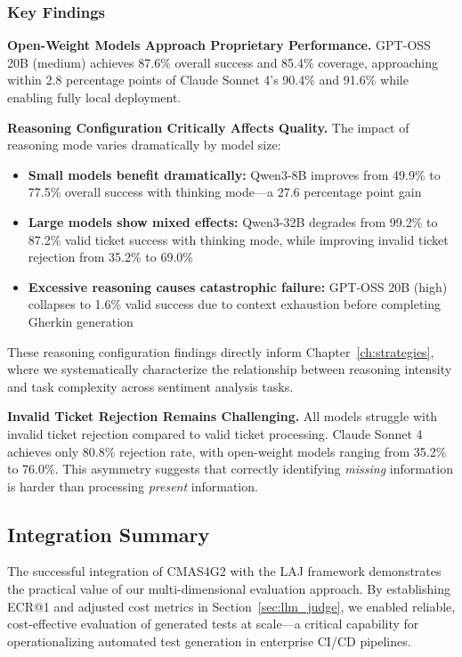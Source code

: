 \subsubsection{Key Findings}

\textbf{Open-Weight Models Approach Proprietary Performance.} GPT-OSS 20B (medium) achieves 87.6\% overall success and 85.4\% coverage, approaching within 2.8 percentage points of Claude Sonnet 4's 90.4\% and 91.6\% while enabling fully local deployment.

\textbf{Reasoning Configuration Critically Affects Quality.} The impact of reasoning mode varies dramatically by model size:
\begin{itemize}[leftmargin=*]
    \item \textbf{Small models benefit dramatically:} Qwen3-8B improves from 49.9\% to 77.5\% overall success with thinking mode---a 27.6 percentage point gain
    \item \textbf{Large models show mixed effects:} Qwen3-32B degrades from 99.2\% to 87.2\% valid ticket success with thinking mode, while improving invalid ticket rejection from 35.2\% to 69.0\%
    \item \textbf{Excessive reasoning causes catastrophic failure:} GPT-OSS 20B (high) collapses to 1.6\% valid success due to context exhaustion before completing Gherkin generation
\end{itemize}

These reasoning configuration findings directly inform Chapter~\ref{ch:strategies}, where we systematically characterize the relationship between reasoning intensity and task complexity across sentiment analysis tasks.

\textbf{Invalid Ticket Rejection Remains Challenging.} All models struggle with invalid ticket rejection compared to valid ticket processing. Claude Sonnet 4 achieves only 80.8\% rejection rate, with open-weight models ranging from 35.2\% to 76.0\%. This asymmetry suggests that correctly identifying \textit{missing} information is harder than processing \textit{present} information.

\subsection{Integration Summary}

The successful integration of CMAS4G2 with the LAJ framework demonstrates the practical value of our multi-dimensional evaluation approach. By establishing ECR@1 and adjusted cost metrics in Section~\ref{sec:llm_judge}, we enabled reliable, cost-effective evaluation of generated tests at scale---a critical capability for operationalizing automated test generation in enterprise CI/CD pipelines.

